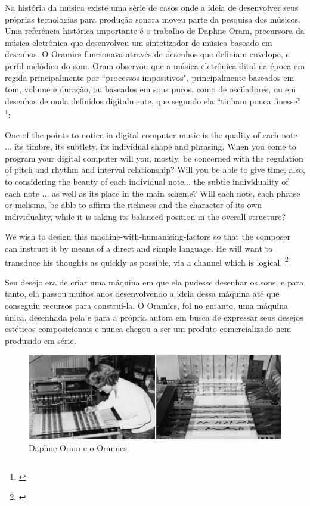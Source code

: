 Na história da música existe uma série de casos onde a ideia de desenvolver seus próprias tecnologias para produção sonora moveu parte da pesquisa dos músicos. Uma referência histórica importante é o trabalho de Daphne Oram, precursora da música eletrônica que desenvolveu um sintetizador de música baseado em desenhos. O Oramics funcionava através de desenhos que definiam envelope, e perfil melódico do som. Oram observou que a música eletrônica dital na época era regida principalmente por ``processos impositivos", principalmente baseados em tom, volume e duração, ou baseados em sons puros, como de osciladores, ou em desenhos de onda definidos digitalmente, que segundo ela ``tinham pouca finesse'' \footnote{\cite[101]{Oram1972}}: 

\begin{citacao}
One of the points to notice in digital computer music is the
quality of each note ... its timbre, its subtlety, its individual shape and phrasing. When you come to program your digital computer will you, mostly, be concerned with the regulation of pitch and rhythm and interval relationship? Will you be able to give time, also, to considering the beauty of each individual note... the subtle individuality of each note ... as well as its place in the main scheme? Will each note, each phrase or melisma, be able to affirm the richness and the character of its own individuality, while it is taking its balanced position in the overall structure? 

We wish to design this machine-with-humanising-factors so that the composer can instruct it by means of a direct and simple language. He will want to transduce his thoughts as quickly as possible, via a channel which is logical. \footnote{\cite[97]{Oram1972}}
\end{citacao}

Seu desejo era de criar uma máquina em que ela pudesse desenhar os sons, e para tanto, ela passou muitos anos desenvolvendo a ideia dessa máquina até que conseguiu recursos para construí-la. O Oramics, foi no entanto, uma máquina única, desenhada pela e para a própria autora em busca de expressar seus desejos estéticos composicionais e nunca chegou a ser um produto comercializado nem produzido em série.   

\begin{figure}
    \caption{\label{oram}Daphne Oram e o Oramics.}
    
        \includegraphics[width=1\linewidth]{pictures/cap2/oramics}
    
\end{figure}


